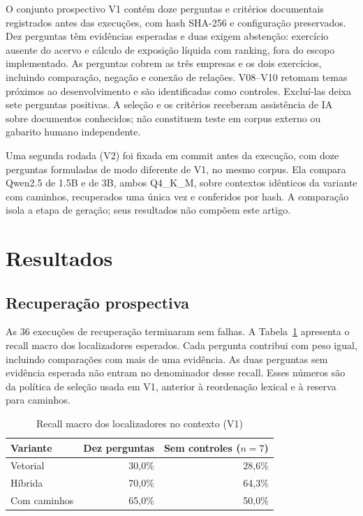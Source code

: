 \documentclass[conference]{IEEEtran}
\begin{document}
O conjunto prospectivo V1 contém doze perguntas e critérios documentais registrados antes das execuções, com hash SHA-256 e configuração preservados. Dez perguntas têm evidências esperadas e duas exigem abstenção: exercício ausente do acervo e cálculo de exposição líquida com ranking, fora do escopo implementado. As perguntas cobrem as três empresas e os dois exercícios, incluindo comparação, negação e conexão de relações. V08--V10 retomam temas próximos ao desenvolvimento e são identificadas como controles. Excluí-las deixa sete perguntas positivas. A seleção e os critérios receberam assistência de IA sobre documentos conhecidos; não constituem teste em corpus externo ou gabarito humano independente.

Uma segunda rodada (V2) foi fixada em commit antes da execução, com doze perguntas formuladas de modo diferente de V1, no mesmo corpus. Ela compara Qwen2.5 de 1.5B e de 3B, ambos Q4\_K\_M, sobre contextos idênticos da variante com caminhos, recuperados uma única vez e conferidos por hash. A comparação isola a etapa de geração; seus resultados não compõem este artigo.

\section{Resultados}

\subsection{Recuperação prospectiva}

As 36 execuções de recuperação terminaram sem falhas. A Tabela~\ref{tab:recall} apresenta o recall macro dos localizadores esperados. Cada pergunta contribui com peso igual, incluindo comparações com mais de uma evidência. As duas perguntas sem evidência esperada não entram no denominador desse recall. Esses números são da política de seleção usada em V1, anterior à reordenação lexical e à reserva para caminhos.

\begin{table}[htbp]
\caption{Recall macro dos localizadores no contexto (V1)}
\label{tab:recall}
\centering
\begin{tabular}{lrr}
\toprule
Variante & Dez perguntas & Sem controles ($n=7$) \\
\midrule
Vetorial     & 30,0\% & 28,6\% \\
Híbrida      & 70,0\% & 64,3\% \\
Com caminhos & 65,0\% & 50,0\% \\
\bottomrule
\end{tabular}
\end{table}
\end{document}
